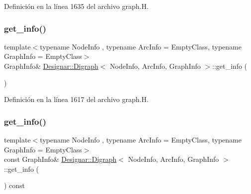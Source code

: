 Definición en la línea 1635 del archivo graph.\+H.

\mbox{\label{class_designar_1_1_digraph_a530d2befede0eede246d9eed6c05f1f6}} 
\subsubsection{\texorpdfstring{get\+\_\+info()}{get\_info()}\hspace{0.1cm}{\footnotesize\ttfamily [1/2]}}
{\footnotesize\ttfamily template$<$typename Node\+Info , typename Arc\+Info  = Empty\+Class, typename Graph\+Info  = Empty\+Class$>$ \\
Graph\+Info\& \hyperlink{class_designar_1_1_digraph}{Designar\+::\+Digraph}$<$ Node\+Info, Arc\+Info, Graph\+Info $>$\+::get\+\_\+info (\begin{DoxyParamCaption}{ }\end{DoxyParamCaption})\hspace{0.3cm}{\ttfamily [inline]}}



Definición en la línea 1617 del archivo graph.\+H.

\mbox{\label{class_designar_1_1_digraph_a113a9f5a392795312a2d0c0d5c86041c}} 
\subsubsection{\texorpdfstring{get\+\_\+info()}{get\_info()}\hspace{0.1cm}{\footnotesize\ttfamily [2/2]}}
{\footnotesize\ttfamily template$<$typename Node\+Info , typename Arc\+Info  = Empty\+Class, typename Graph\+Info  = Empty\+Class$>$ \\
const Graph\+Info\& \hyperlink{class_designar_1_1_digraph}{Designar\+::\+Digraph}$<$ Node\+Info, Arc\+Info, Graph\+Info $>$\+::get\+\_\+info (\begin{DoxyParamCaption}{ }\end{DoxyParamCaption}) const\hspace{0.3cm}{\ttfamily [inline]}}



